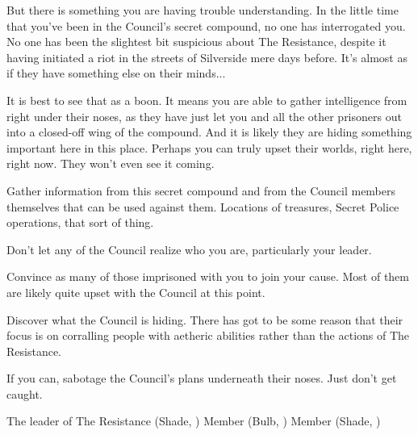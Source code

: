\documentclass[blue]{Silversiders}
\begin{document}
But there is something you are having trouble understanding. In the little time that you've been in the Council's secret compound, no one has interrogated you. No one has been the slightest bit suspicious about The Resistance, despite it having initiated a riot in the streets of Silverside mere days before. It's almost as if they have something else on their minds...

It is best to see that as a boon. It means you are able to gather intelligence from right under their noses, as they have just let you and all the other prisoners out into a closed-off wing of the compound. And it is likely they are hiding something important here in this place. Perhaps you can truly upset their worlds, right here, right now. They won't even see it coming.

\begin{itemz}[Goals]
	\item Gather information from this secret compound and from the Council members themselves that can be used against them. Locations of treasures, Secret Police operations, that sort of thing.
	\item Don't let any of the Council realize who you are, particularly your leader.
	\item Convince as many of those imprisoned with you to join your cause. Most of them are likely quite upset with the Council at this point.
	\item Discover what the Council is hiding. There has got to be some reason that their focus is on corralling people with aetheric abilities rather than the actions of The Resistance.
	\item If you can, sabotage the Council's plans underneath their noses. Just don't get caught.
\end{itemz}

\begin{members}
	\member{\cIngenuity{}} The leader of The Resistance (Shade, \cIngenuity{\Sex})
	\member{\cCaregiver{}} Member (Bulb, \cCaregiver{\Sex})
	\member{\cLove{}} Member (Shade, \cLove{\Sex})
	
\end{members}
\end{document}
